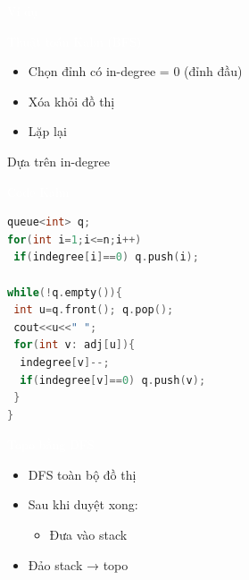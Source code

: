\documentclass{beamer}
\newcommand{\hlblue}[1]{\textcolor{myblue}{#1}}
\newcommand{\hlgreen}[1]{\textcolor{mygreen}{#1}}
\newcommand{\hlpurple}[1]{\textcolor{mypurple}{#1}}
\newcommand{\hlwhite}[1]{\textcolor{white}{#1}}
\begin{document}
\begin{frame}{\hlwhite{Ví dụ}}
\centering
{}
\end{frame}


\begin{frame}{\hlwhite{Thuật toán Kahn (BFS)}}
\begin{itemize}
\item Chọn đỉnh có \hlblue{in-degree = 0} (đỉnh đầu)
\item Xóa khỏi đồ thị
\item Lặp lại
\end{itemize}

\begin{tcolorbox}
\centering
\hlpurple{Dựa trên in-degree}
\end{tcolorbox}
\end{frame}

\begin{frame}[fragile]{\hlwhite{Code Kahn}}
\begin{lstlisting}[language=C++]
queue<int> q;
for(int i=1;i<=n;i++)
 if(indegree[i]==0) q.push(i);

while(!q.empty()){
 int u=q.front(); q.pop();
 cout<<u<<" ";
 for(int v: adj[u]){
  indegree[v]--;
  if(indegree[v]==0) q.push(v);
 }
}
\end{lstlisting}
\end{frame}


\begin{frame}{\hlwhite{Topo bằng DFS}}
\begin{itemize}
\item DFS toàn bộ đồ thị
\item Sau khi duyệt xong:
\begin{itemize}
\item Đưa vào stack
\end{itemize}
\item Đảo stack → topo
\end{itemize}
\end{frame}
\end{document}

